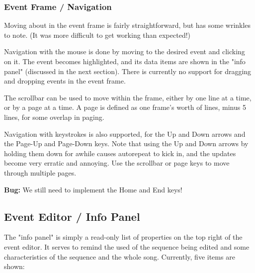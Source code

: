 \subsubsection{Event Frame / Navigation}
\label{subsec:seq64_event_frame_navigation}

   Moving about in the event frame is fairly straightforward, but has some
   wrinkles to note.  (It was more difficult to get working than expected!)

   Navigation with the mouse is done by moving to the desired event and
   clicking on it.  The event becomes highlighted, and its data items are shown
   in the "info panel" (discussed in the next section).
   There is currently no support for dragging and dropping events in the event
   frame.

   The scrollbar can be used to move within the frame, either by one line at a
   time, or by a page at a time.  A page is defined as one frame's worth of
   lines, minus 5 lines, for some overlap in paging.

   Navigation with keystrokes is also supported, for the Up and Down arrows and
   the Page-Up and Page-Down keys.  Note that using the Up and Down arrows by
   holding them down for awhile causes autorepeat to kick in, and the updates
   become very erratic and annoying.  Use the scrollbar or page keys to
   move through multiple pages.

   \textbf{Bug:}
   We still need to implement the Home and End keys!

\subsection{Event Editor / Info Panel}
\label{subsec:seq64_event_editor_info}

   The "info panel" is simply a read-only list of properties on the top right
   of the event editor.  It serves to remind the used of the sequence being
   edited and some characteristics of the sequence and the whole song.
   Currently, five items are shown:

